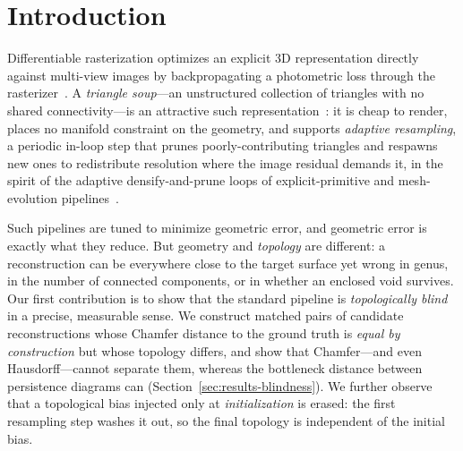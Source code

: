\section{Introduction}
\label{sec:intro}

Differentiable rasterization optimizes an explicit 3D representation directly
against multi-view images by backpropagating a photometric loss through the
rasterizer~\cite{loper2014opendr,kato2018neural,liu2019softras,laine2020nvdiffrast}.
A \emph{triangle soup}---an unstructured collection of triangles
with no shared connectivity---is an attractive such
representation~\cite{tojo2026diffsoup}: it is cheap
to render, places no manifold constraint on the geometry, and supports
\emph{adaptive resampling}, a periodic in-loop step that prunes
poorly-contributing triangles and respawns new ones to redistribute resolution
where the image residual demands it, in the spirit of the adaptive
densify-and-prune loops of explicit-primitive and mesh-evolution
pipelines~\cite{kerbl2023gaussians,held2025trianglesplatting,nicolet2021largesteps,palfinger2022remeshing}.

Such pipelines are tuned to minimize geometric error, and geometric error is
exactly what they reduce. But geometry and \emph{topology} are different: a
reconstruction can be everywhere close to the target surface yet wrong in genus,
in the number of connected components, or in whether an enclosed void survives.
Our first contribution is to show that the standard pipeline is
\emph{topologically blind} in a precise, measurable sense. We construct matched
pairs of candidate reconstructions whose Chamfer distance to the ground truth is
\emph{equal by construction} but whose topology differs, and show that
Chamfer---and even Hausdorff---cannot separate them, whereas the
bottleneck distance between persistence diagrams can
(Section~\ref{sec:results-blindness}). We further observe that a topological
bias injected only at \emph{initialization} is erased: the first resampling step
washes it out, so the final topology is independent of the initial bias.

